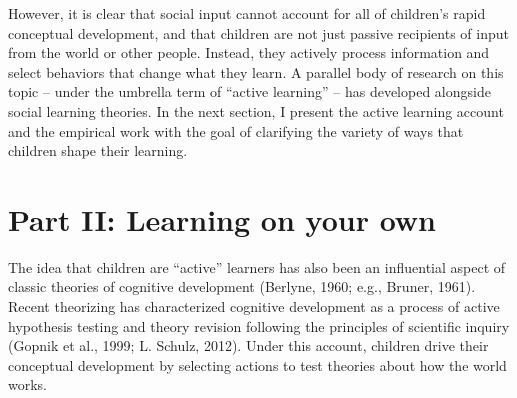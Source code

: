 \documentclass[english,floatsintext,man]{apa6}
\theoremstyle{definition}
\theoremstyle{definition}
\theoremstyle{definition}
\theoremstyle{remark}
\begin{document}
However, it is clear that social input cannot account for all of
children's rapid conceptual development, and that children are not just
passive recipients of input from the world or other people. Instead,
they actively process information and select behaviors that change what
they learn. A parallel body of research on this topic -- under the
umbrella term of \enquote{active learning} -- has developed alongside
social learning theories. In the next section, I present the active
learning account and the empirical work with the goal of clarifying the
variety of ways that children shape their learning.


\hypertarget{p2}{\section{Part II: Learning on your own}\label{p2}}

The idea that children are \enquote{active} learners has also been an
influential aspect of classic theories of cognitive development
(Berlyne, 1960; e.g., Bruner, 1961). Recent theorizing has characterized
cognitive development as a process of active hypothesis testing and
theory revision following the principles of scientific inquiry (Gopnik
et al., 1999; L. Schulz, 2012). Under this account, children drive their
conceptual development by selecting actions to test theories about how
the world works.
\end{document}

